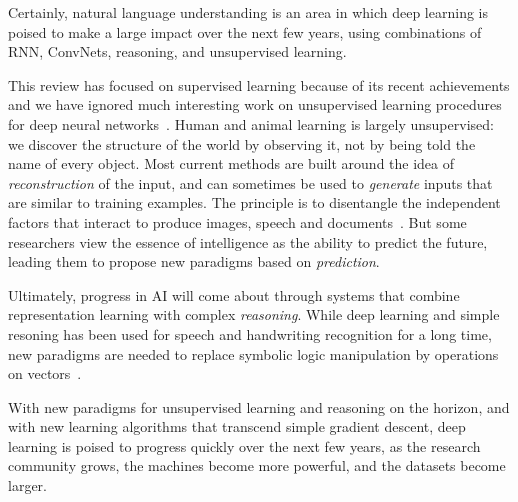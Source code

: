 \documentclass[10pts]{article}
\begin{document}
Certainly, natural language understanding is an area in which deep
learning is poised to make a large impact over the next few years,
using combinations of RNN, ConvNets, reasoning, and unsupervised
learning.

This review has focused on supervised learning because of its recent
achievements and we have ignored much interesting work on unsupervised
learning procedures for deep neural
networks~\citep{Salakhutdinov2009-small,Hinton95,VincentPLarochelleH2008-small,koray-nips-10,gregor-icml-10,ranzato-pami,Bengio-et-al-ICML-2014,Kingma-et-al-NIPS2014}.
Human and animal learning is largely unsupervised: we discover the
structure of the world by observing it, not by being told the name of
every object. Most current methods are built around the idea of {\em
  reconstruction} of the input, and can sometimes be used to {\em
  generate} inputs that are similar to training examples. The
principle is to disentangle the independent factors that interact to
produce images, speech and
documents~\citep{Bengio-Courville-Vincent-TPAMI2013}.  But some
researchers view the essence of intelligence as the ability to predict
the future, leading them to propose new paradigms based on
{\em prediction}.

Ultimately, progress in AI will come about through systems that
combine representation learning with complex {\em reasoning}. While
deep learning and simple resoning has been used for speech and
handwriting recognition for a long time, new paradigms are needed to
replace symbolic logic manipulation by operations on
vectors~\citep{bottou-mlj-2014}.

With new paradigms for unsupervised learning and reasoning on the
horizon, and with new learning algorithms that transcend simple
gradient descent, deep learning is poised to progress quickly over the
next few years, as the research community grows, the machines become
more powerful, and the datasets become larger.

 





\end{document}

